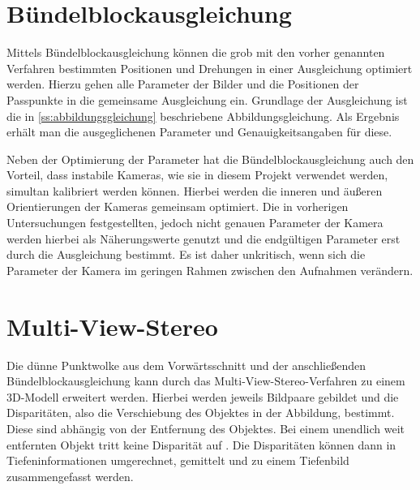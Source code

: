 \documentclass[./00PhotoBox.tex]{subfiles}
\begin{document}

\section{Bündelblockausgleichung}
\label{s:buendelblock}
Mittels Bündelblockausgleichung können die grob mit den vorher genannten Verfahren bestimmten Positionen und Drehungen in einer Ausgleichung optimiert werden. Hierzu gehen alle Parameter der Bilder und die Positionen der Passpunkte in die gemeinsame Ausgleichung ein. Grundlage der Ausgleichung ist die in \autoref{ss:abbildungsgleichung} beschriebene Abbildungsgleichung. Als Ergebnis erhält man die ausgeglichenen Parameter und Genauigkeitsangaben für diese. \citep[S. 343ff]{luhmann}

Neben der Optimierung der Parameter hat die Bündelblockausgleichung auch den Vorteil, dass instabile Kameras, wie sie in diesem Projekt verwendet werden, simultan kalibriert werden können. Hierbei werden die inneren und äußeren Orientierungen der Kameras gemeinsam optimiert. Die in vorherigen Untersuchungen festgestellten, jedoch nicht genauen Parameter der Kamera werden hierbei als Näherungswerte genutzt und die endgültigen Parameter erst durch die Ausgleichung bestimmt. Es ist daher unkritisch, wenn sich die Parameter der Kamera im geringen Rahmen zwischen den Aufnahmen verändern. \citep[S. 357f]{luhmann}


\section{Multi-View-Stereo}
Die dünne Punktwolke aus dem Vorwärtsschnitt und der anschließenden Bündel\-block\-ausgleichung kann durch das Multi-View-Stereo-Verfahren zu einem 3D-Modell erweitert werden. Hierbei werden jeweils Bildpaare gebildet und die Disparitäten, also die Verschiebung des Objektes in der Abbildung, bestimmt. Diese sind abhängig von der Entfernung des Objektes. Bei einem unendlich weit entfernten Objekt tritt keine Disparität auf \citep[S. 313]{luhmann}. Die Disparitäten können dann in Tiefeninformationen umgerechnet, gemittelt und zu einem Tiefenbild zusammengefasst werden. \citep[S. 505]{luhmann}
\end{document}
